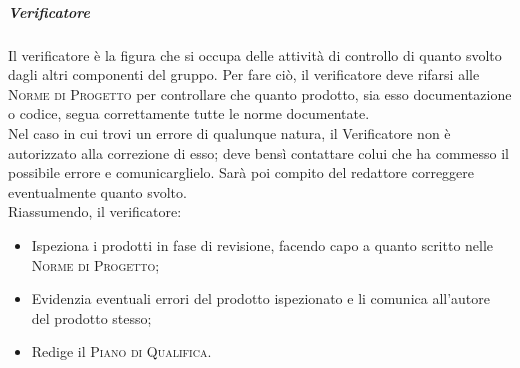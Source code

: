 \documentclass[../norme-di-progetto.tex]{subfiles}
\begin{document}
\subparagraph{Verificatore}
Il verificatore è la figura che si occupa delle attività di controllo di quanto svolto dagli altri componenti del gruppo. Per fare ciò, il verificatore deve rifarsi alle \textsc{Norme di Progetto} per controllare che quanto prodotto, sia esso documentazione o codice, segua correttamente tutte le norme documentate. \\
Nel caso in cui trovi un errore di qualunque natura, il Verificatore non è autorizzato alla correzione di esso; deve bensì contattare colui che ha commesso il possibile errore e comunicarglielo. Sarà poi compito del redattore correggere eventualmente quanto svolto. \\
Riassumendo, il verificatore:
\begin{itemize}
  \item Ispeziona i prodotti in fase di revisione, facendo capo a quanto scritto nelle \textsc{Norme di Progetto};
  \item Evidenzia eventuali errori del prodotto ispezionato e li comunica all'autore del prodotto stesso;
  \item Redige il \textsc{Piano di Qualifica}.
\end{itemize}
\end{document}
